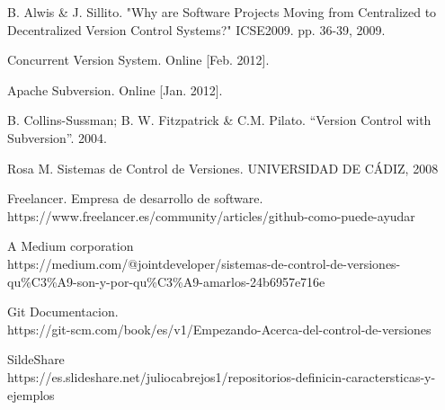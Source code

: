 \documentclass[a4paper,12pt]{article}
\begin{document}
{\begin{thebibliography}{9}
 B. Alwis \& J. Sillito. "Why are Software Projects Moving from Centralized to Decentralized Version Control Systems?" ICSE2009. pp. 36-39, 2009.


\bibitem[12]{} Concurrent Version System. Online [Feb. 2012].

\bibitem[13]{} Apache Subversion. Online [Jan. 2012].



 B. Collins-Sussman; B. W. Fitzpatrick \& C.M. Pilato. “Version Control with Subversion”. 
2004.



 Rosa M. Sistemas de Control de Versiones. UNIVERSIDAD DE CÁDIZ, 2008

 Freelancer. Empresa de desarrollo de software.\\ https://www.freelancer.es/community/articles/github-como-puede-ayudar

A Medium corporation\\
https://medium.com/@jointdeveloper/sistemas-de-control-de-versiones-qu\%C3\%A9-son-y-por-qu\%C3\%A9-amarlos-24b6957e716e



 Git Documentacion.\\
https://git-scm.com/book/es/v1/Empezando-Acerca-del-control-de-versiones


 SildeShare  \\
https://es.slideshare.net/juliocabrejos1/repositorios-definicin-caractersticas-y-ejemplos


\end{thebibliography}}
\end{document}

